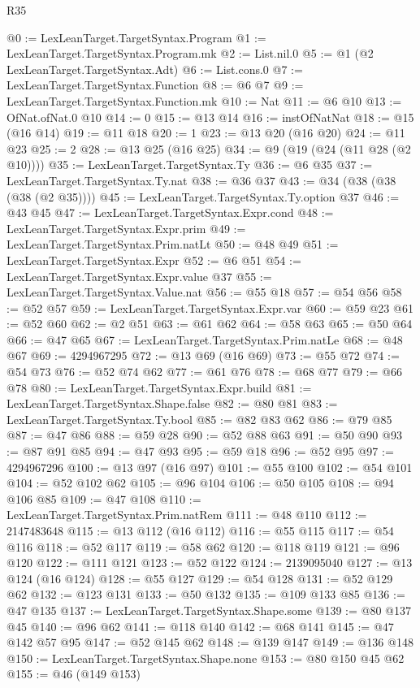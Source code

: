 \begin{lexlean}{R35}
\begin{coremodule}
@0 := LexLeanTarget.TargetSyntax.Program
@1 := LexLeanTarget.TargetSyntax.Program.mk
@2 := List.nil.{0}
@5 := @1 (@2 LexLeanTarget.TargetSyntax.Adt)
@6 := List.cons.{0}
@7 := LexLeanTarget.TargetSyntax.Function
@8 := @6 @7
@9 := LexLeanTarget.TargetSyntax.Function.mk
@10 := Nat
@11 := @6 @10
@13 := OfNat.ofNat.{0} @10
@14 := 0
@15 := @13 @14
@16 := instOfNatNat
@18 := @15 (@16 @14)
@19 := @11 @18
@20 := 1
@23 := @13 @20 (@16 @20)
@24 := @11 @23
@25 := 2
@28 := @13 @25 (@16 @25)
@34 := @9 (@19 (@24 (@11 @28 (@2 @10))))
@35 := LexLeanTarget.TargetSyntax.Ty
@36 := @6 @35
@37 := LexLeanTarget.TargetSyntax.Ty.nat
@38 := @36 @37
@43 := @34 (@38 (@38 (@38 (@2 @35))))
@45 := LexLeanTarget.TargetSyntax.Ty.option @37
@46 := @43 @45
@47 := LexLeanTarget.TargetSyntax.Expr.cond
@48 := LexLeanTarget.TargetSyntax.Expr.prim
@49 := LexLeanTarget.TargetSyntax.Prim.natLt
@50 := @48 @49
@51 := LexLeanTarget.TargetSyntax.Expr
@52 := @6 @51
@54 := LexLeanTarget.TargetSyntax.Expr.value @37
@55 := LexLeanTarget.TargetSyntax.Value.nat
@56 := @55 @18
@57 := @54 @56
@58 := @52 @57
@59 := LexLeanTarget.TargetSyntax.Expr.var
@60 := @59 @23
@61 := @52 @60
@62 := @2 @51
@63 := @61 @62
@64 := @58 @63
@65 := @50 @64
@66 := @47 @65
@67 := LexLeanTarget.TargetSyntax.Prim.natLe
@68 := @48 @67
@69 := 4294967295
@72 := @13 @69 (@16 @69)
@73 := @55 @72
@74 := @54 @73
@76 := @52 @74 @62
@77 := @61 @76
@78 := @68 @77
@79 := @66 @78
@80 := LexLeanTarget.TargetSyntax.Expr.build
@81 := LexLeanTarget.TargetSyntax.Shape.false
@82 := @80 @81
@83 := LexLeanTarget.TargetSyntax.Ty.bool
@85 := @82 @83 @62
@86 := @79 @85
@87 := @47 @86
@88 := @59 @28
@90 := @52 @88 @63
@91 := @50 @90
@93 := @87 @91 @85
@94 := @47 @93
@95 := @59 @18
@96 := @52 @95
@97 := 4294967296
@100 := @13 @97 (@16 @97)
@101 := @55 @100
@102 := @54 @101
@104 := @52 @102 @62
@105 := @96 @104
@106 := @50 @105
@108 := @94 @106 @85
@109 := @47 @108
@110 := LexLeanTarget.TargetSyntax.Prim.natRem
@111 := @48 @110
@112 := 2147483648
@115 := @13 @112 (@16 @112)
@116 := @55 @115
@117 := @54 @116
@118 := @52 @117
@119 := @58 @62
@120 := @118 @119
@121 := @96 @120
@122 := @111 @121
@123 := @52 @122
@124 := 2139095040
@127 := @13 @124 (@16 @124)
@128 := @55 @127
@129 := @54 @128
@131 := @52 @129 @62
@132 := @123 @131
@133 := @50 @132
@135 := @109 @133 @85
@136 := @47 @135
@137 := LexLeanTarget.TargetSyntax.Shape.some
@139 := @80 @137 @45
@140 := @96 @62
@141 := @118 @140
@142 := @68 @141
@145 := @47 @142 @57 @95
@147 := @52 @145 @62
@148 := @139 @147
@149 := @136 @148
@150 := LexLeanTarget.TargetSyntax.Shape.none
@153 := @80 @150 @45 @62
@155 := @46 (@149 @153)

\end{coremodule}
\end{lexlean}
